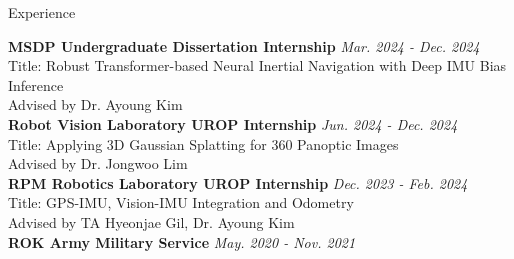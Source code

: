 \begin{rSection}{Experience}

{\bf MSDP Undergraduate Dissertation Internship} \hfill {\em Mar. 2024 - Dec. 2024} \\
Title: Robust Transformer-based Neural Inertial Navigation with Deep IMU Bias Inference\\
Advised by Dr. Ayoung Kim\\

{\bf Robot Vision Laboratory UROP Internship} \hfill {\em \textit{Jun. 2024 - Dec. 2024}} \\
Title: Applying 3D Gaussian Splatting for 360 Panoptic Images \\
Advised by Dr. Jongwoo Lim \\

{\bf RPM Robotics Laboratory UROP Internship} \hfill {\em \textit{Dec. 2023 - Feb. 2024}} \\
Title: GPS-IMU, Vision-IMU Integration and Odometry \\
Advised by TA Hyeonjae Gil, Dr. Ayoung Kim \\

{\bf ROK Army Military Service} \hfill {\em May. 2020 - Nov. 2021} \\

\end{rSection}